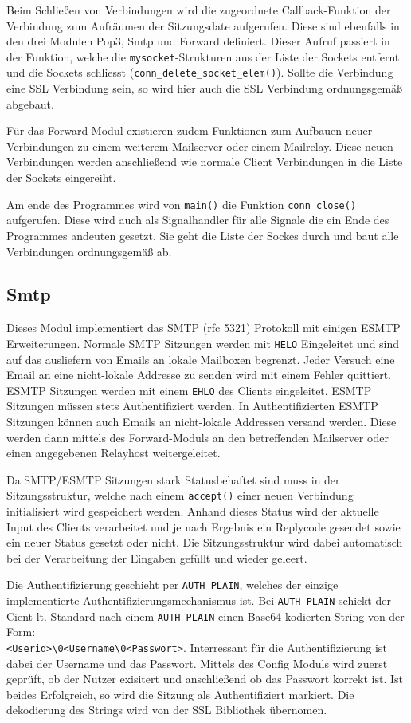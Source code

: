 \documentclass[final,a4paper,11pt,notitlepage,halfparskip]{scrreprt}
\begin{document}
Beim Schließen von Verbindungen wird die zugeordnete Callback-Funktion der
Verbindung zum Aufräumen der Sitzungsdate aufgerufen. Diese sind ebenfalls in
den drei Modulen Pop3, Smtp und Forward definiert. Dieser Aufruf passiert in der
Funktion, welche die \texttt{mysocket}-Strukturen aus der Liste der Sockets
entfernt und die Sockets schliesst (\texttt{conn\_delete\_socket\_elem()}).
Sollte die Verbindung eine SSL Verbindung sein, so wird hier auch die SSL
Verbindung ordnungsgemäß abgebaut.

Für das Forward Modul existieren zudem Funktionen zum Aufbauen neuer Verbindungen
zu einem weiterem Mailserver oder einem Mailrelay. Diese neuen Verbindungen
werden anschließend wie normale Client Verbindungen in die Liste der Sockets
eingereiht.

Am ende des Programmes wird von \texttt{main()} die Funktion 
\texttt{conn\_close()} aufgerufen. Diese wird auch als Signalhandler für alle
Signale die ein Ende des Programmes andeuten gesetzt. Sie geht die Liste der
Sockes durch und baut alle Verbindungen ordnungsgemäß ab.


\subsection{Smtp}
Dieses Modul implementiert das SMTP (rfc 5321) Protokoll mit einigen ESMTP 
Erweiterungen. Normale SMTP Sitzungen werden mit \texttt{HELO} Eingeleitet und
sind auf das ausliefern von Emails an lokale Mailboxen begrenzt. Jeder Versuch
eine Email an eine nicht-lokale Addresse zu senden wird mit einem Fehler
quittiert. ESMTP Sitzungen werden mit einem \texttt{EHLO} des Clients
eingeleitet. ESMTP Sitzungen müssen stets Authentifiziert werden. In
Authentifizierten ESMTP Sitzungen können auch Emails an nicht-lokale Addressen
versand werden. Diese werden dann mittels des Forward-Moduls an den betreffenden
Mailserver oder einen angegebenen Relayhost weitergeleitet.

Da SMTP/ESMTP Sitzungen stark Statusbehaftet sind muss in der Sitzungsstruktur,
welche nach einem \texttt{accept()} einer neuen Verbindung initialisiert wird
gespeichert werden. Anhand dieses Status wird der aktuelle Input des Clients
verarbeitet und je nach Ergebnis ein Replycode gesendet sowie ein neuer Status 
gesetzt oder nicht. Die Sitzungsstruktur wird dabei automatisch bei der
Verarbeitung der Eingaben gefüllt und wieder geleert.

Die Authentifizierung geschieht per \texttt{AUTH PLAIN}, welches der einzige
implementierte Authentifizierungsmechanismus ist. Bei \texttt{AUTH PLAIN}
schickt der Cient lt. Standard nach einem \texttt{AUTH PLAIN} einen Base64
kodierten String von der Form:\\
\texttt{<Userid>\textbackslash0<Username\textbackslash0<Passwort>}. 
Interressant für die Authentifizierung ist dabei der Username und das Passwort.
Mittels des Config Moduls wird zuerst geprüft, ob der Nutzer exisitert und
anschließend ob das Passwort korrekt ist. Ist beides Erfolgreich, so wird die
Sitzung als Authentifiziert markiert. Die dekodierung des Strings wird von der
SSL Bibliothek übernomen.
\end{document}
